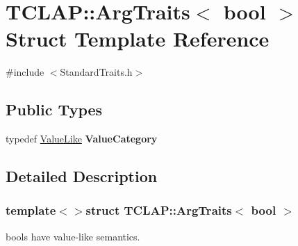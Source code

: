 \hypertarget{struct_t_c_l_a_p_1_1_arg_traits_3_01bool_01_4}{\section{T\+C\+L\+A\+P\+:\+:Arg\+Traits$<$ bool $>$ Struct Template Reference}
\label{struct_t_c_l_a_p_1_1_arg_traits_3_01bool_01_4}
}


{\ttfamily \#include $<$Standard\+Traits.\+h$>$}

\subsection*{Public Types}
\begin{DoxyCompactItemize}
\item 
\hypertarget{struct_t_c_l_a_p_1_1_arg_traits_3_01bool_01_4_a86efe13e981aaef96d37ec465a8409a7}{typedef \hyperlink{struct_t_c_l_a_p_1_1_value_like}{Value\+Like} {\bfseries Value\+Category}}\label{struct_t_c_l_a_p_1_1_arg_traits_3_01bool_01_4_a86efe13e981aaef96d37ec465a8409a7}

\end{DoxyCompactItemize}


\subsection{Detailed Description}
\subsubsection*{template$<$$>$struct T\+C\+L\+A\+P\+::\+Arg\+Traits$<$ bool $>$}

bools have value-\/like semantics. 